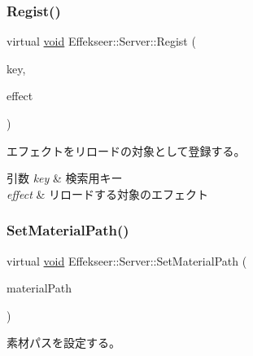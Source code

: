 \subsubsection{\texorpdfstring{Regist()}{Regist()}}
{\footnotesize\ttfamily virtual \mbox{\hyperlink{namespace_effekseer_ab34c4088e512200cf4c2716f168deb56}{void}} Effekseer\+::\+Server\+::\+Regist (\begin{DoxyParamCaption}\item[{const \mbox{\hyperlink{_effekseer_8h_a50b026abea014b47854bcd835b3b6233}{E\+F\+K\+\_\+\+C\+H\+AR}} $\ast$}]{key,  }\item[{\mbox{\hyperlink{class_effekseer_1_1_effect}{Effect}} $\ast$}]{effect }\end{DoxyParamCaption})\hspace{0.3cm}{\ttfamily [pure virtual]}}



エフェクトをリロードの対象として登録する。 


\begin{DoxyParams}{引数}
{\em key} & 検索用キー \\
\hline
{\em effect} & リロードする対象のエフェクト \\
\hline
\end{DoxyParams}
\mbox{\label{class_effekseer_1_1_server_a4c0d31a5fd39184615179157a6929296}} 
\subsubsection{\texorpdfstring{Set\+Material\+Path()}{SetMaterialPath()}}
{\footnotesize\ttfamily virtual \mbox{\hyperlink{namespace_effekseer_ab34c4088e512200cf4c2716f168deb56}{void}} Effekseer\+::\+Server\+::\+Set\+Material\+Path (\begin{DoxyParamCaption}\item[{const \mbox{\hyperlink{_effekseer_8h_a50b026abea014b47854bcd835b3b6233}{E\+F\+K\+\_\+\+C\+H\+AR}} $\ast$}]{material\+Path }\end{DoxyParamCaption})\hspace{0.3cm}{\ttfamily [pure virtual]}}



素材パスを設定する。 

\mbox{\label{class_effekseer_1_1_server_afd333e58d1330710673caf909452a4c1}} 
